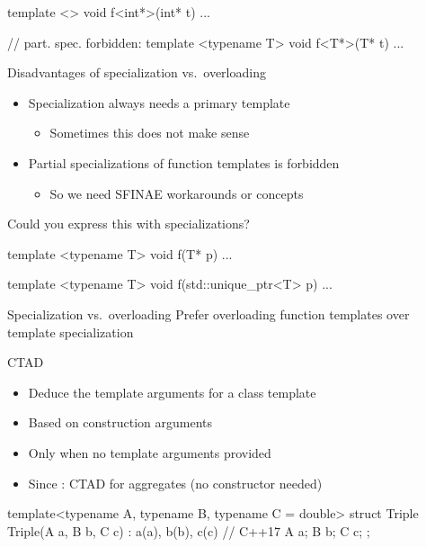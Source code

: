 \begin{advanced}
\begin{frame}[fragile]
\begin{multicols}{2}
\begin{cppcode*}{}
      template <>
      void f<int*>(int* t) { ... }

      // part. spec. forbidden:
      template <typename T>
      void f<T*>(T* t) {...}
    \end{cppcode*}
  \end{multicols}
\end{frame}

\begin{frame}[fragile]
  \begin{block}{Disadvantages of specialization vs.\ overloading}
    \begin{itemize}
      \item Specialization always needs a primary template
      \begin{itemize}
        \item Sometimes this does not make sense
      \end{itemize}
      \item Partial specializations of function templates is forbidden
      \begin{itemize}
        \item So we need SFINAE workarounds or concepts
      \end{itemize}
    \end{itemize}
  \end{block}
  \small
  \begin{block}{Could you express this with specializations?}
    \begin{cppcode}
      template <typename T>
      void f(T* p) { ... }

      template <typename T>
      void f(std::unique_ptr<T> p) { ... }
    \end{cppcode}
  \end{block}
  \begin{goodpractice}{Specialization vs.\ overloading}
    Prefer overloading function templates over template specialization
  \end{goodpractice}
\end{frame}

\begin{frame}[fragile]
  \begin{block}{CTAD}
    \begin{itemize}
    \item Deduce the template arguments for a class template
    \item Based on construction arguments
    \item Only when no template arguments provided
    \item Since : CTAD for aggregates (no constructor needed)
    \end{itemize}
  \end{block}
  \begin{cppcode*}{}
    template<typename A, typename B, typename C = double>
    struct Triple {
      Triple(A a, B b, C c) : a(a), b(b), c(c) {} // C++17
      A a; B b; C c;
    };


\end{cppcode*}
\end{frame}
\end{advanced}
